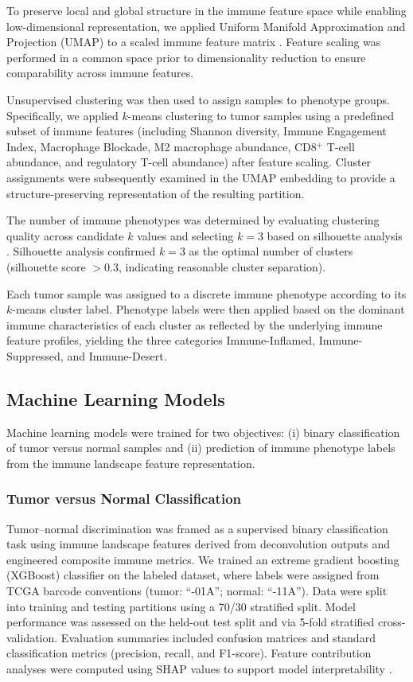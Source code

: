 \documentclass[conference]{IEEEtran}
\begin{document}
To preserve local and global structure in the immune feature space while enabling low-dimensional representation, we applied Uniform Manifold Approximation and Projection (UMAP) to a scaled immune feature matrix \cite{McInnes2018UMAP}.
Feature scaling was performed in a common space prior to dimensionality reduction to ensure comparability across immune features.

Unsupervised clustering was then used to assign samples to phenotype groups.
Specifically, we applied $k$-means clustering \cite{MacQueen1967} to tumor samples using a predefined subset of immune features (including Shannon diversity, Immune Engagement Index, Macrophage Blockade, M2 macrophage abundance, CD8$^+$ T-cell abundance, and regulatory T-cell abundance) after feature scaling.
Cluster assignments were subsequently examined in the UMAP embedding to provide a structure-preserving representation of the resulting partition.

The number of immune phenotypes was determined by evaluating clustering quality across candidate $k$ values and selecting $k=3$ based on silhouette analysis \cite{Rousseeuw1987}. Silhouette analysis confirmed $k=3$ as the optimal number of clusters (silhouette score $>0.3$, indicating reasonable cluster separation).

Each tumor sample was assigned to a discrete immune phenotype according to its $k$-means cluster label.
Phenotype labels were then applied based on the dominant immune characteristics of each cluster as reflected by the underlying immune feature profiles, yielding the three categories Immune-Inflamed, Immune-Suppressed, and Immune-Desert.

\subsection{Machine Learning Models}
Machine learning models were trained for two objectives: (i) binary classification of tumor versus normal samples and (ii) prediction of immune phenotype labels from the immune landscape feature representation.

\subsubsection{Tumor versus Normal Classification}
Tumor--normal discrimination was framed as a supervised binary classification task using immune landscape features derived from deconvolution outputs and engineered composite immune metrics.
We trained an extreme gradient boosting (XGBoost) classifier \cite{ChenGuestrin2016} on the labeled dataset, where labels were assigned from TCGA barcode conventions (tumor: ``-01A''; normal: ``-11A'').
Data were split into training and testing partitions using a 70/30 stratified split.
Model performance was assessed on the held-out test split and via 5-fold stratified cross-validation.
Evaluation summaries included confusion matrices and standard classification metrics (precision, recall, and F1-score).
Feature contribution analyses were computed using SHAP values to support model interpretability \cite{Lundberg2017}.
\end{document}
